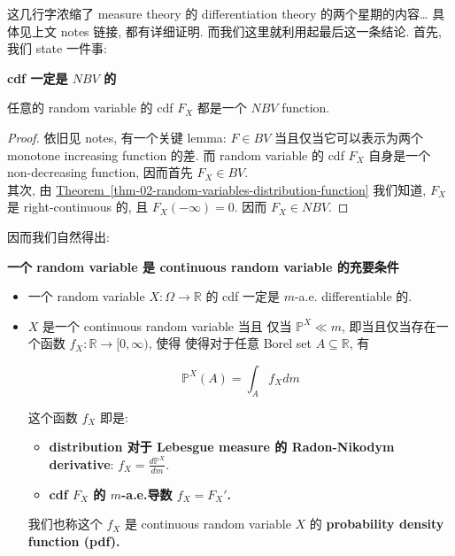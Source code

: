 \documentclass{qlnotes-export}
\begin{document}
这几行字浓缩了 measure theory 的 differentiation theory 的两个星期的内容\ldots{} 具体见上文 notes 链接, 都有详细证明. 而我们这里就利用起最后这一条结论. 首先, 我们 state 一件事:

\begin{lemma}{\protect{}\label{kn-cdf-nbv}{\textbf{cdf 一定是 \(NBV\)
的}}}

任意的 random variable 的 cdf \(F_{X}\) 都是一个 \(NBV\) function.

\end{lemma}

\begin{proof}

依旧见 notes, 有一个关键 lemma: \(F \in BV\) 当且仅当它可以表示为两个 monotone increasing function 的差. 而 random variable 的 cdf \(F_{X}\) 自身是一个 non-decreasing function, 因而首先 \(F_{X} \in BV\).\\
其次, 由 \hyperref[thm-02-random-variables-distribution-function]{Theorem~\ref*{thm-02-random-variables-distribution-function}} 我们知道, \(F_{X}\) 是 right-continuous 的, 且 \(F_{X}( - \infty) = 0\). 因而 \(F_{X} \in NBV\).

\end{proof}

因而我们自然得出:

\begin{theorem}{\protect{}\label{kn-random-variable-continuous-random-variable}{\textbf{一个
random variable 是 continuous random variable 的充要条件}}}

\begin{itemize}
\item
  一个 random variable \(X:\Omega\rightarrow{\mathbb{R}}\) 的 cdf 一定是 \(m\)-a.e. differentiable 的.
\item
  \(X\) 是一个 continuous random variable 当且 仅当 \({\mathbb{P}}^{X} \ll m\), 即当且仅当存在一个函数 \(f_{X}:{\mathbb{R}}\rightarrow\lbrack 0,\infty)\), 使得 使得对于任意 Borel set \(A \subseteq {\mathbb{R}}\), 有

  \[{\mathbb{P}}^{X}(A) = \int_{A}f_{X} dm\]

  这个函数 \(f_{X}\) 即是:

  \begin{itemize}
  \item
    \textbf{distribution 对于 Lebesgue measure 的 Radon-Nikodym derivative}: \(f_{X} = \frac{d{\mathbb{P}}^{X}}{dm}\).
  \item
    \textbf{cdf \(F_{X}\) 的 \(m\)-a.e.导数 \(f_{X} = F_{X}'\).}
  \end{itemize}

  我们也称这个 \(f_{X}\) 是 continuous random variable \(X\) 的 \textbf{probability density function (pdf).}
\end{itemize}

\end{theorem}
\end{document}
